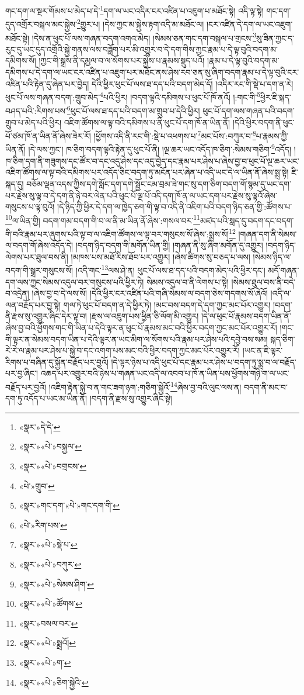 གང་དག་ལ་སྔར་གོམས་པ་མེད་པ་དེ་\footnote{«སྣར་»དེ་དེ་}དག་ལ་ཡང་འདིར་ངར་འཛིན་པ་འཇུག་པ་མཐོང་སྟེ། འདི་ལྟ་སྟེ། གང་དག་དུད་འགྲོར་བསྐལ་མང་སྐྱེས་\footnote{«སྣར་»«པེ་»བསྐྱལ་}གྱུར་པ། །དེས་ཀྱང་མ་སྐྱེས་རྟག་འདི་མ་མཐོང་ལ། །ངར་འཛིན་དེ་དག་ལ་ཡང་འཇུག་མཐོང་སྟེ། །དེས་ན་ཕུང་པོ་ལས་གཞན་བདག་འགའ་མེད། །སེམས་ཅན་གང་དག་བསྐལ་པ་གྲངས་\footnote{«སྣར་»«པེ་»བགྲངས་}སུ་ཟིན་ཀྱང་ད་རུང་དུ་ཡང་དུད་འགྲོའི་སྐྱེ་གནས་ལས་བཟློག་པར་མི་འགྱུར་བ་དེ་དག་གིས་ཀྱང་རྣམ་པ་དེ་ལྟ་བུའི་བདག་མ་དམིགས་སོ། །ཀྱང་གི་སྒྲས་ནི་དམྱལ་བ་ལ་སོགས་པར་སྐྱེས་པ་རྣམས་སྡུད་པའོ། །རྣམ་པ་དེ་ལྟ་བུའི་བདག་མ་དམིགས་པ་དེ་དག་ལ་ཡང་ངར་འཛིན་པ་འཇུག་པར་མཐོང་ནས་ཤེས་རབ་ཅན་སུ་ཞིག་བདག་རྣམ་པ་དེ་ལྟ་བུའི་ངར་འཛིན་པའི་རྟེན་དུ་ཞེན་པར་བྱེད། དེའི་ཕྱིར་ཕུང་པོ་ལས་ཐ་དད་པའི་བདག་མེད་དོ། །འདིར་རང་གི་སྡེ་པ་དག་ན་རེ། ཕུང་པོ་ལས་གཞན་བདག་:གྲུབ་མེད་\footnote{«པེ་»གྲུབ་}པའི་ཕྱིར། །བདག་ལྟའི་དམིགས་པ་ཕུང་པོ་ཁོ་ནའོ། །:གང་གི་\footnote{«སྣར་»གང་དག་«པེ་»གང་དག་གི་}ཕྱིར་ཇི་སྐད་བཤད་པའི་:རིགས་པས་\footnote{«པེ་»རིག་པས་}ཕུང་པོ་ལས་ཐ་དད་པའི་བདག་མ་གྲུབ་པ་དེའི་ཕྱིར། ཕུང་པོ་དག་ལས་གཞན་པའི་བདག་གྲུབ་པ་མེད་པའི་ཕྱིར། འཇིག་ཚོགས་ལ་ལྟ་བའི་དམིགས་པ་ནི་ཕུང་པོ་དག་ཁོ་ན་ཡིན་ནོ། །དེའི་ཕྱིར་བདག་ནི་ཕུང་པོ་ཙམ་ཁོ་ན་ཡིན་ནོ་ཞེས་ཟེར་རོ། །ཕྱོགས་འདི་ནི་རང་གི་:སྡེ་པ་འཕགས་པ་\footnote{«སྣར་»«པེ་»སྡེ་པ་}མང་པོས་:བཀུར་བ་\footnote{«སྣར་»«པེ་»བཀུར་}པ་རྣམས་ཀྱི་ཡིན་ནོ། །དེ་ལས་ཀྱང་། ཁ་ཅིག་བདག་ལྟའི་རྟེན་དུ་ཕུང་པོ་ནི། །ལྔ་ཆར་ཡང་འདོད་ཁ་ཅིག་:སེམས་གཅིག་\footnote{«སྣར་»«པེ་»སེམས་ཤིག་}འདོད། །ཁ་ཅིག་དག་ནི་གཟུགས་དང་ཚོར་བ་དང་འདུ་ཤེས་དང་འདུ་བྱེད་དང་རྣམ་པར་ཤེས་པ་ཞེས་བྱ་བ་ཕུང་པོ་ལྔ་ཆར་ཡང་འཇིག་ཚོགས་ལ་ལྟ་བའི་དམིགས་པར་འདོད་ཅིང་བདག་ཏུ་མངོན་པར་ཞེན་པ་འདི་ཡང་དེ་ལ་ཡིན་ནོ་ཞེས་སྨྲ་སྟེ། ཇི་སྐད་དུ། བཅོམ་ལྡན་འདས་ཀྱིས་དགེ་སློང་དག་དགེ་སྦྱོང་ངམ་བྲམ་ཟེ་གང་སུ་དག་ཅིག་བདག་གོ་སྙམ་དུ་ཡང་དག་པར་རྗེས་སུ་ལྟ་བ་དེ་དག་ནི་ཉེ་བར་ལེན་པའི་ཕུང་པོ་ལྔ་པོ་འདི་དག་ཁོ་ན་ལ་ཡང་དག་པར་རྗེས་སུ་ལྟའོ་ཞེས་གསུངས་པ་ལྟ་བུའོ། །དེ་ཉིད་ཀྱི་ཕྱིར་དེ་དག་ལ་ཁྱེད་ཅག་གི་ལྟ་བ་འདི་ནི་འཇིག་པའི་བདག་ཉིད་ཅན་གྱི་:ཚོགས་པ་\footnote{«སྣར་»«པེ་»ཚོགས་}ལ་ཡིན་གྱི། བདག་གམ་བདག་གི་བ་ལ་ནི་མ་ཡིན་ནོ་ཞེས་:གསལ་བར་\footnote{«སྣར་»བསལ་བར་}མཛད་པའི་སླད་དུ་བདག་དང་བདག་གི་བའི་རྣམ་པར་ཞུགས་པའི་ལྟ་བ་ལ་འཇིག་ཚོགས་ལ་ལྟ་བར་གསུངས་སོ་ཞེས་:སྨྲས་སོ།\footnote{«སྣར་»«པེ་»སྨྲའོ།} །གཞན་དག་ནི་སེམས་ལ་བདག་གོ་ཞེས་འདོད་དེ། །བདག་ཉིད་བདག་གི་མགོན་ཡིན་གྱི། །གཞན་ནི་སུ་ཞིག་མགོན་དུ་འགྱུར། །བདག་ཉིད་ལེགས་པར་ཐུལ་བས་ནི། །མཁས་པས་མཐོ་རིས་ཐོབ་པར་འགྱུར། །ཞེས་ཚིགས་སུ་བཅད་པ་ལས། །སེམས་ཉིད་ལ་བདག་གི་སྒྲར་གསུངས་སོ། །འདི་གང་\footnote{«སྣར་»«པེ་»ག་}ལས་ཤེ་ན། ཕུང་པོ་ལས་ཐ་དད་པའི་བདག་མེད་པའི་ཕྱིར་དང་། མདོ་གཞན་དག་ལས་ཀྱང་སེམས་འདུལ་བར་གསུངས་པའི་ཕྱིར་ཏེ། སེམས་འདུལ་བ་ནི་ལེགས་པ་སྟེ། །སེམས་ཐུལ་བས་ནི་བདེ་བ་འདྲེན། །ཞེས་བྱ་བ་དེ་ལས་སོ། །དེའི་ཕྱིར་ངར་འཛིན་པའི་གཞི་སེམས་ལ་བདག་ཅེས་གདགས་སོ་ཞེའོ། །འདི་ལ་ལན་བརྗོད་པར་བྱ་སྟེ། གལ་ཏེ་ཕུང་པོ་བདག་ན་དེ་ཕྱིར་ཏེ། །མང་བས་བདག་དེ་དག་ཀྱང་མང་པོར་འགྱུར། །བདག་ནི་རྫས་སུ་འགྱུར་ཞིང་དེར་ལྟ་བ། །རྫས་ལ་འཇུག་པས་ཕྱིན་ཅི་ལོག་མི་འགྱུར། །དེ་ལ་ཕུང་པོ་རྣམས་བདག་ཡིན་ནོ་ཞེས་བྱ་བའི་ཕྱོགས་གང་གི་ཡིན་པ་དེའི་ལྟར་ན་ཕུང་པོ་རྣམས་མང་བའི་ཕྱིར་བདག་ཀྱང་མང་པོར་འགྱུར་རོ། །གང་གི་ལྟར་ན་སེམས་བདག་ཡིན་པ་དེའི་ལྟར་ན་ཡང་མིག་ལ་སོགས་པའི་རྣམ་པར་ཤེས་པའི་དབྱེ་བས་སམ། སྐད་ཅིག་རེ་རེ་ལ་རྣམ་པར་ཤེས་པ་སྐྱེ་བ་དང་འགག་པས་མང་བའི་ཕྱིར་བདག་ཀྱང་མང་པོར་འགྱུར་རོ། །ཡང་ན་ཇི་ལྟར་རིགས་པ་བཞིན་དུ་སྐྱོན་བརྗོད་པར་བྱའོ། །དེ་ལྟར་ཉེས་པ་འདི་ཕུང་པོ་དང་རྣམ་པར་ཤེས་པ་བདག་ཏུ་སྨྲ་བ་ལ་བརྗོད་པར་བྱ་ཞིང་། འཆད་པར་འགྱུར་བའི་ཉེས་པ་གཞན་ཡང་འདི་ལ་འབབ་པ་ཁོ་ན་ཡིན་པས་ཕྱོགས་གཉི་ག་ལ་ཡང་བརྗོད་པར་བྱའོ། །འཇིག་རྟེན་སྐྱེ་བ་ན་གང་ཟག་ཉག་:གཅིག་སྐྱེའོ་\footnote{«སྣར་»«པེ་»ཅིག་སྐྱེའི་}ཞེས་བྱ་བའི་ལུང་ལས་ན། བདག་ནི་མང་བ་དག་ཏུ་འདོད་པ་ཡང་མ་ཡིན་ནོ། །བདག་ནི་རྫས་སུ་འགྱུར་ཞིང་སྟེ། 